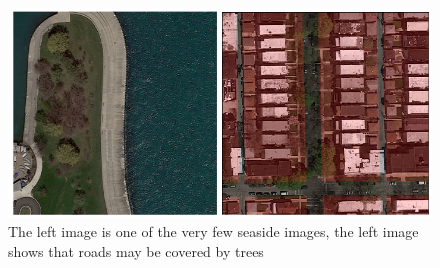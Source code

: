 \documentclass[10pt,conference,compsocconf]{IEEEtran}
\begin{document}
\begin{figure}[h]
	\centering
	\includegraphics[width=\columnwidth]{img/corner_cases1.png}
	\vspace{-3mm}
	\caption{The left image is one of the very few seaside images, the left image shows that roads may be covered by trees}
	\label{fig:corner-cases}
\end{figure}
\end{document}
